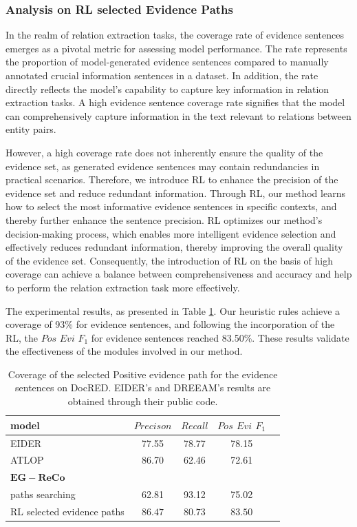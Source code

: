 \documentclass[preprint,12pt]{elsarticle}
\begin{document}
\subsubsection{ Analysis on RL selected Evidence Paths}\label{subsubsec10}
In the realm of relation extraction tasks, the coverage rate of evidence sentences emerges as a pivotal metric for assessing model performance. The rate represents the proportion of model-generated evidence sentences compared to manually annotated crucial information sentences in a dataset. In addition, the rate directly reflects the model's capability to capture key information in relation extraction tasks. A high evidence sentence coverage rate signifies that the model can comprehensively capture information in the text relevant to relations between entity pairs.

However, a high coverage rate does not inherently ensure the quality of the evidence set, as generated evidence sentences may contain redundancies in practical scenarios. Therefore, we introduce RL to enhance the precision of the evidence set and reduce redundant information. Through RL, our method learns how to select the most informative evidence sentences in specific contexts, and thereby further enhance the sentence precision. RL optimizes our method's decision-making process, which enables more intelligent evidence selection and effectively reduces redundant information, thereby improving the overall quality of the evidence set. Consequently, the introduction of RL on the basis of high coverage can achieve a balance between comprehensiveness and accuracy and help to perform the relation extraction task more effectively. 

The experimental results, as presented in Table \ref{tab4}. Our heuristic rules achieve a coverage of 93\% for evidence sentences, and following the incorporation of the RL, the $Pos$ $Evi$ $F_1$ for evidence sentences reached 83.50\%. These results validate the effectiveness of the modules involved in our method.

\begin{table}[h]
\caption{Coverage of the selected Positive evidence path for the evidence sentences on DocRED. EIDER’s and DREEAM’s results are obtained through their public code.}\label{tab4}
\begin{tabular*}{\textwidth}{@{\extracolsep\fill}lcccc}
\hline
model & $Precison$ & $Recall$ & $Pos$  $Evi$  $F_1$\\
\hline
EIDER\cite{xie-etal-2022-eider}  &77.55& 78.77 & 78.15\\
ATLOP\cite{zhou2021document}  &86.70 & 62.46 &72.61 & \\
\hline
$\mathbf{EG-ReCo}$    & & &  & \\
paths searching  &62.81 & 93.12&75.02 \\
RL selected evidence paths  &$\mathbf{86.47}$ & $\mathbf{80.73}$ & $\mathbf{83.50}$\\
\hline
\end{tabular*}
\end{table}
\end{document}
